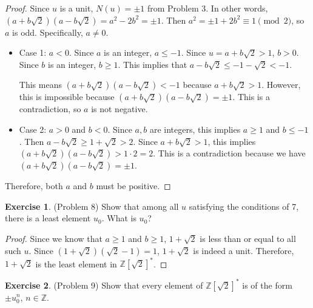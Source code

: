 \documentclass[12pt, psamsfonts]{amsart}
\theoremstyle{definition}
\newtheorem*{exer}{Exercise}
\theoremstyle{remark}
\numberwithin{equation}{section}
\begin{document}
\begin{proof}
  Since $u$ is a unit, $N(u) = \pm 1$ from Problem 3.
  In other words, $(a + b\sqrt{2})(a - b\sqrt{2}) = a^2 - 2b^2 = \pm 1$.
  Then $a^2 = \pm 1 + 2b^2 \equiv 1 \pmod 2$, so $a$ is odd.
  Specifically, $a \ne 0$.
  \begin{itemize}
    \item
      Case 1: $a < 0$.
      Since $a$ is an integer, $a \leq -1$.
      Since $u = a + b\sqrt{2} > 1$, $b > 0$.
      Since $b$ is an integer, $b \geq 1$.
      This implies that $a - b\sqrt{2} \leq -1 - \sqrt{2} < -1$.

      This means $(a + b\sqrt{2})(a - b\sqrt{2}) < -1$ because $a + b\sqrt{2} > 1$.
      However, this is impossible because $(a + b\sqrt{2})(a - b\sqrt{2}) = \pm 1$.
      This is a contradiction, so $a$ is not negative.
    \item
      Case 2: $a > 0$ and $b < 0$.
      Since $a, b$ are integers, this implies $a \geq 1$ and $b \leq -1$.
      Then $a - b\sqrt{2} \geq 1 + \sqrt{2} > 2$.
      Since $a + b\sqrt{2} > 1$, this implies $(a + b\sqrt{2})(a - b\sqrt{2}) > 1 \cdot 2 = 2$.
      This is a contradiction because we have $(a + b\sqrt{2})(a - b\sqrt{2}) = \pm 1$.
  \end{itemize}
  Therefore, both $a$ and $b$ must be positive.
\end{proof}

\begin{exer}{(Problem 8)}
  Show that among all $u$ satisfying the conditions of 7, there is a least element $u_0$.
  What is $u_0$?
\end{exer}

\begin{proof}
  Since we know that $a \geq 1$ and $b \geq 1$, $1 + \sqrt{2}$ is less than or equal to all such $u$.
  Since $(1 + \sqrt{2})(\sqrt{2} - 1) = 1$, $1 + \sqrt{2}$ is indeed a unit.
  Therefore, $1 + \sqrt{2}$ is the least element in $\mathbb{Z}[\sqrt{2}]^*$.
\end{proof}

\begin{exer}{(Problem 9)}
  Show that every element of $\mathbb{Z}[\sqrt{2}]^*$ is of the form $\pm u_0^n$, $n \in \mathbb{Z}$.
\end{exer}
\end{document}
